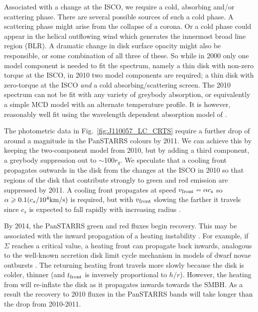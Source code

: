 \documentclass[a4paper,fleqn,usenatbib]{mnras}
\begin{document}
Associated with a
change at the ISCO, we require a cold, absorbing and/or scattering
phase. There are several possible sources of such a cold phase. A
scattering phase might arise from the collapse of a corona. Or a cold
phase could appear in the helical outflowing wind which generates the
innermost broad line region (BLR). A dramatic change in disk surface
opacity might also be responsible, or some combination of all three of
these. So while in 2000 only one model component is needed to fit the
spectrum, namely a thin disk with non-zero torque at the ISCO, in 2010
two model components are required; a thin disk with zero-torque at the
ISCO \emph{and} a cold absorbing/scattering screen. The 2010 spectrum
can not be fit with any variety of greybody absorption, or
equivalently a simple MCD model with an alternate temperature
profile. It is however, reasonably well fit using the wavelength
dependent absorption model of \citep{Guo2016}.

The photometric data in Fig.~\ref{fig:J110057_LC_CRTS} require a
further drop of around a magnitude in the PanSTARRS colours by
2011. We can achieve this by keeping the two-component model from
2010, but by adding a third component, a greybody suppression out to
$\sim$100$r_{g}$. We speculate that a cooling front propagates outwards
in the disk from the changes at the ISCO in 2010 so that regions of
the disk that contribute strongly to green and red emission are
suppressed by 2011. A cooling front propagates at speed $v_{\rm
front}=\alpha c_{\rm s}$ \citep{Hameury2009} so $\alpha \geq
0.1(c_{s}/10^{4}{\rm km/s})$ is required, but with $v_{\rm front}$
slowing the farther it travels since $c_{s}$ is expected to fall
rapidly with increasing radius \citep{Sirko_Goodman2003}.

By 2014, the PanSTARRS green and red fluxes begin recovery. This may
be associated with the inward propagation of a heating instability
\citep{Hameury2009}. For example, if $\Sigma$ reaches a critical
value, a heating front can propagate back inwards, analogous to the
well-known accretion disk limit cycle mechanism in models of dwarf
novae outbursts \citep[e.g.,][]{Cannizzo1998}. The returning heating
front travels more slowly because the disk is colder, thinner (and
$t_{\rm front}$ is inversely proportional to $h/r$). However, the
heating from will re-inflate the disk as it propagates inwards towards
the SMBH. As a result the recovery to 2010 fluxes in the PanSTARRS
bands will take longer than the drop from 2010-2011.
\end{document}

